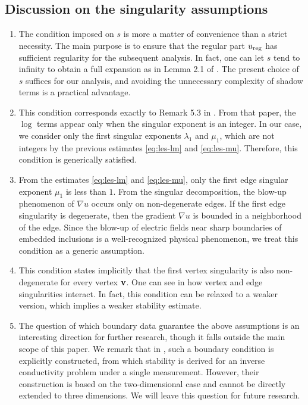 ﻿\documentclass[11pt,reqno,oneside]{amsart}
\theoremstyle{definition}
\theoremstyle{remark}
\newcommand{\n}{\nabla}
\newcommand{\lm}{\lambda}
\begin{document}
    \subsection*{Discussion on the singularity assumptions}
    \begin{enumerate}
        \item The condition imposed on $s$ is more a matter of convenience than a strict necessity. The main purpose is to ensure that the regular part $u_{\rm reg}$ has sufficient regularity for the subsequent analysis. In fact, one can let $s$ tend to infinity to obtain a full expansion as in Lemma 2.1 of \cite{Bellout1992}. The present choice of $s$ suffices for our analysis, and avoiding the unnecessary complexity of shadow terms is a practical advantage.
        \item This condition corresponds exactly to Remark 5.3 in \cite{Dauge1999}. From that paper, the $\log$ terms appear only when the singular exponent is an integer. In our case, we consider only the first singular exponents $\lm_1$ and $\mu_1$, which are not integers by the previous estimates \eqref{eq:les-lm} and \eqref{eq:les-mu}. Therefore, this condition is generically satisfied.
        \item From the estimates \eqref{eq:les-lm} and \eqref{eq:les-mu}, only the first edge singular exponent $\mu_1$ is less than $1$. From the singular decomposition, the blow-up phenomenon of $\n u$ occurs only on non-degenerate edges. If the first edge singularity is degenerate, then the gradient $\n u$ is bounded in a neighborhood of the edge. Since the blow-up of electric fields near sharp boundaries of embedded inclusions is a well-recognized physical phenomenon, we treat this condition as a generic assumption.  
        \item This condition states implicitly that the first vertex singularity is also non-degenerate for every vertex ${\bf v}$. One can see in \cite{Dauge1999} how vertex and edge singularities interact. In fact, this condition can be relaxed to a weaker version, which implies a weaker stability estimate.
        \item The question of which boundary data guarantee the above assumptions is an interesting direction for further research, though it falls outside the main scope of this paper. We remark that in \cite{Kang1997,Alessandrini1992,Alessandrini1994}, such a boundary condition is explicitly constructed, from which stability is derived for an inverse conductivity problem under a single measurement. However, their construction is based on the two-dimensional case and cannot be directly extended to three dimensions. We will leave this question for future research.
    \end{enumerate}
\end{document}
